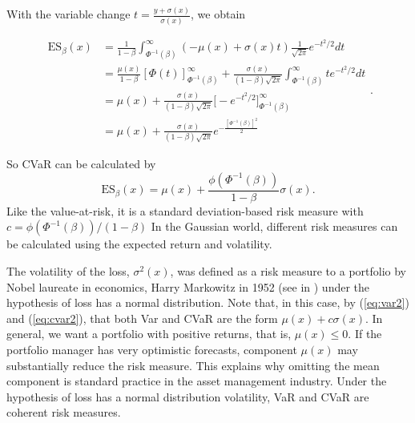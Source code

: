 With the variable change
$t=\frac{y+\sigma(x)}{\sigma(x)}$, we obtain

\[
	\begin{aligned}
		\mbox{ES}_\beta(x) & = \frac{1}{1-\beta}\int_{\Phi^{-1}(\beta)}^\infty (-\mu(x)+ \sigma(x)t) \frac{1}{\sqrt{2\pi}} e^{-t^2/2}dt \\
		                   & = \frac{\mu(x)}{1-\beta}[\Phi(t)]_{\Phi^{-1}(\beta)}^\infty +
		\frac{\sigma(x)}{(1-\beta)\sqrt{2\pi}}\int_{\Phi^{-1}(\beta)}^\infty t e^{-t^2/ 2}dt                                            \\
		                   & =\mu(x) + \frac{\sigma(x)}{(1-\beta)\sqrt{2\pi}}\Big[-e^{-t^2/2} \Big] _{\Phi^{-1}(\beta)}^\infty          \\
		                   & = \mu(x) + \frac{\sigma(x)}{(1-\beta)\sqrt{2\pi}}e^{-\frac{[\Phi^{-1}(\beta)]^2}{2}}
	\end{aligned}.
\]

So CVaR can be calculated by
\begin{equation}\label{eq:cvar2}
	\mbox{ES}_\beta(x)=\mu(x) + \frac{\phi(\Phi^{-1}(\beta))}{1-\beta}\sigma(x).
\end{equation}
Like the value-at-risk, it is a standard deviation-based risk measure with $c ={\phi(\Phi^{-1}(\beta))}/{(1-\beta)}$
In the Gaussian world, different risk measures can be calculated using the expected return and volatility.

The volatility of the loss, $\sigma^2(x)$,  was defined as a risk measure to a portfolio by Nobel laureate in economics, Harry Markowitz in 1952 (see in \cite{Markowitz1952}) under the hypothesis of loss has a normal distribution. Note that, in this case,  by (\ref{eq:var2}) and (\ref{eq:cvar2}), that both Var and CVaR are the form $\mu(x)+c\sigma(x)$. In general, we want a portfolio with positive returns, that is, $\mu(x)\leq0$. If the portfolio manager has very optimistic forecasts, component $\mu(x)$ may substantially reduce the risk measure. This explains why omitting the mean component is standard practice in the asset management industry. Under the hypothesis of loss has a normal distribution volatility, VaR and CVaR are coherent risk measures.

